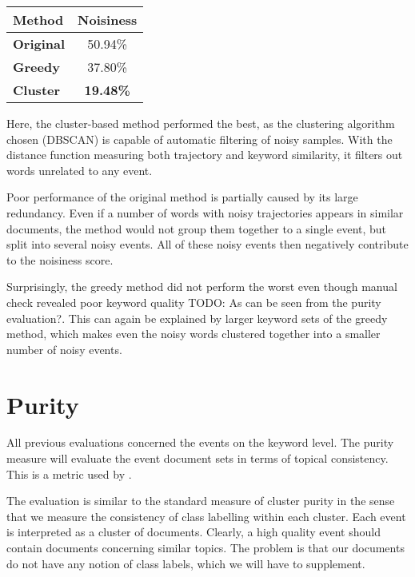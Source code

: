 \hspace{\fill}

\begin{minipage}{\linewidth}
\centering
\begin{tabular}{ l c }\toprule[1.5pt]
\bf Method 	 & \bf Noisiness \\ \midrule
\bf Original &  50.94\% \\
\bf Greedy   &  37.80\% \\
\bf Cluster &  \bf 19.48\% \\ \bottomrule[1.25pt]
\end {tabular}\par
{} \label{tab:title} 
\end{minipage}

\hspace{\fill}

Here, the cluster-based method performed the best, as the clustering algorithm chosen (DBSCAN) is capable of automatic filtering of noisy samples. With the distance function measuring both trajectory and keyword similarity, it filters out words unrelated to any event.

Poor performance of the original method is partially caused by its large redundancy. Even if a number of words with noisy trajectories appears in similar documents, the method would not group them together to a single event, but split into several noisy events. All of these noisy events then negatively contribute to the noisiness score.

Surprisingly, the greedy method did not perform the worst even though manual check revealed poor keyword quality {\color{red} TODO: As can be seen from the purity evaluation?}. This can again be explained by larger keyword sets of the greedy method, which makes even the noisy words clustered together into a smaller number of noisy events.

\newpage

\section{Purity}

All previous evaluations concerned the events on the keyword level. The purity measure will evaluate the event document sets in terms of topical consistency. This is a metric used by \cite{document-purity}.

The evaluation is similar to the standard measure of cluster purity in the sense that we measure the consistency of class labelling within each cluster. Each event is interpreted as a cluster of documents. Clearly, a high quality event should contain documents concerning similar topics. The problem is that our documents do not have any notion of class labels, which we will have to supplement.


